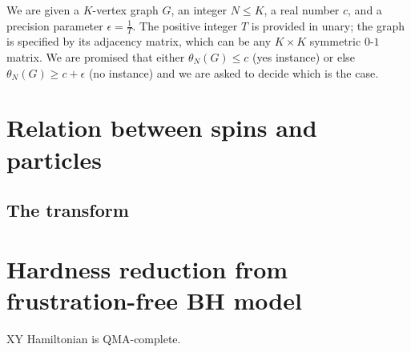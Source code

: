 \documentclass[../thesis-main/thesis-main]{subfiles}
\begin{document}
\begin{problem}
We are given a $K$-vertex graph $G$, an integer $N\leq K$, a real number $c$, and a precision parameter $\epsilon=\frac{1}{T}$. The positive integer $T$ is provided in unary; the graph is specified by its adjacency matrix, which can be any $K\times K$ symmetric $0$-$1$ matrix. We are promised that either $\theta_N(G)\leq c$ (yes instance) or else $\theta_N(G)\geq c+\epsilon$ (no instance) and we are asked to decide which is the case.
\end{problem}


\section{Relation between spins and particles}

\subsection{The transform}

\section{Hardness reduction from frustration-free BH model}

\begin{theorem}\label{thm:XY}
XY Hamiltonian is QMA-complete.
\end{theorem}
\end{document}
